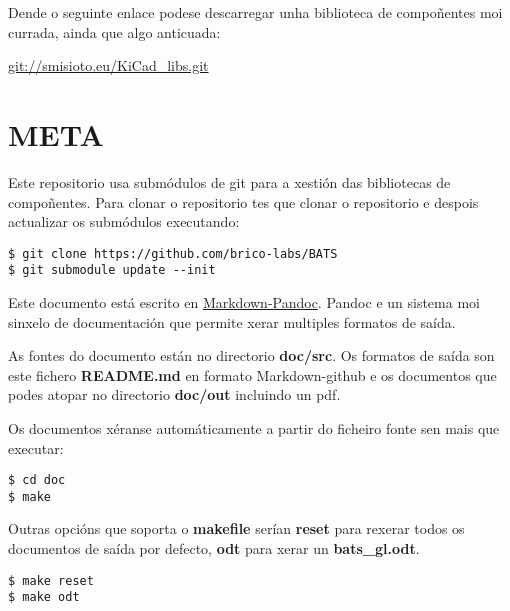 \documentclass[12pt,galician,]{article}
\begin{document}
Dende o seguinte enlace podese descarregar unha biblioteca de
compoñentes moi currada, ainda que algo anticuada:

\url{git://smisioto.eu/KiCad_libs.git}

\hypertarget{meta}{\section{META}\label{meta}}

Este repositorio usa submódulos de git para a xestión das bibliotecas de
compoñentes. Para clonar o repositorio tes que clonar o repositorio e
despois actualizar os submódulos executando:

\begin{verbatim}
$ git clone https://github.com/brico-labs/BATS
$ git submodule update --init
\end{verbatim}

Este documento está escrito en
\href{http://pandoc.org/README.html}{Markdown-Pandoc}. Pandoc e un
sistema moi sinxelo de documentación que permite xerar multiples
formatos de saída.

As fontes do documento están no directorio \textbf{doc/src}. Os formatos
de saída son este fichero \textbf{README.md} en formato Markdown-github
e os documentos que podes atopar no directorio \textbf{doc/out}
incluindo un pdf.

Os documentos xéranse automáticamente a partir do ficheiro fonte sen
mais que executar:

\begin{verbatim}
$ cd doc
$ make
\end{verbatim}

Outras opcións que soporta o \textbf{makefile} serían \textbf{reset}
para rexerar todos os documentos de saída por defecto, \textbf{odt} para
xerar un \textbf{bats\_gl.odt}.

\begin{verbatim}
$ make reset
$ make odt
\end{verbatim}
\end{document}
